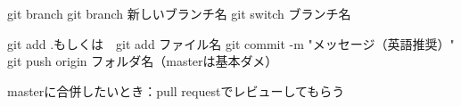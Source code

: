 git branch
git branch 新しいブランチ名
git switch ブランチ名

git add .もしくは　git add ファイル名
git commit -m "メッセージ（英語推奨）"
git push origin フォルダ名（masterは基本ダメ）

masterに合併したいとき：pull requestでレビューしてもらう
